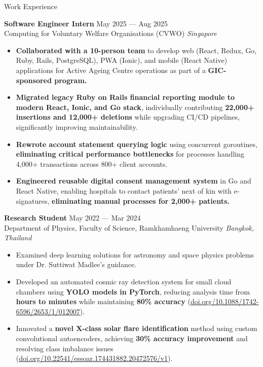 \documentclass{phanuphat_srisukhawasu_resume} %
\begin{document}
\begin{rSection}{Work Experience}

  \textbf{Software Engineer Intern} \hfill May 2025 --- Aug 2025 \\
  Computing for Voluntary Welfare Organisations (CVWO) \hfill \textit{Singapore}
  \begin{itemize}
    \item \textbf{Collaborated with a 10-person team} to develop web (React, Redux, Go, Ruby, Rails, PostgreSQL), PWA (Ionic), and mobile (React Native) applications for Active Ageing Centre operations as part of a \textbf{GIC-sponsored program.}
    \item \textbf{Migrated legacy Ruby on Rails financial reporting module to modern React, Ionic, and Go stack}, individually contributing \textbf{22,000+ insertions and 12,000+ deletions} while upgrading CI/CD pipelines, significantly improving maintainability.
    \item \textbf{Rewrote account statement querying logic} using concurrent goroutines, \textbf{eliminating critical performance bottlenecks} for processes handling 4,000+ transactions across 800+ client accounts.
    \item \textbf{Engineered reusable digital consent management system} in Go and React Native, enabling hospitals to contact patients' next of kin with e-signatures, \textbf{eliminating manual processes for 2,000+ patients.}
  \end{itemize}

  \textbf{Research Student} \hfill May 2022 --- Mar 2024 \\
  Department of Physics, Faculty of Science, Ramkhamhaeng University \hfill \textit{Bangkok, Thailand}
  \begin{itemize}
    \item Examined deep learning solutions for astronomy and space physics problems under Dr. Suttiwat Madlee's guidance.   
    \item Developed an automated cosmic ray detection system for small cloud chambers using \textbf{YOLO models in PyTorch}, reducing analysis time from \textbf{hours to minutes} while maintaining \textbf{80\% accuracy} (\href{https://iopscience.iop.org/article/10.1088/1742-6596/2653/1/012007}{doi.org/10.1088/1742-6596/2653/1/012007}).
    \item Innovated a \textbf{novel X-class solar flare identification} method using custom convolutional autoencoders, achieving \textbf{30\% accuracy improvement} and resolving class imbalance issues (\href{https://essopenarchive.org/users/803138/articles/1189366-enhancing-strong-solar-flare-prediction-using-convolutional-autoencoders-for-anomaly-detection-on-hmi-magnetograms}{doi.org/10.22541/essoar.174431882.20472576/v1}).
  \end{itemize}

\end{rSection} 
\end{document}
